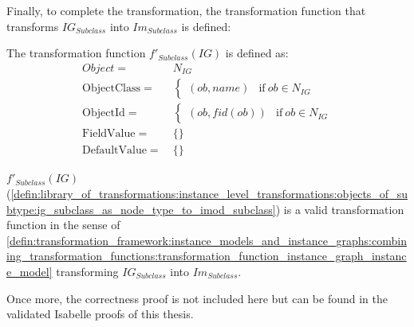 Finally, to complete the transformation, the transformation function that transforms $IG_{Subclass}$ into $Im_{Subclass}$ is defined:

\begin{defin}
\label{defin:library_of_transformations:instance_level_transformations:objects_of_subtype:ig_subclass_as_node_type_to_imod_subclass}
The transformation function $f'_{Subclass}(IG)$ is defined as:
\begin{align*}
Object =\ &N_{IG} \\
\mathrm{ObjectClass} =\ & \begin{cases}
    (ob, name) & \mathrm{if }\ ob \in N_{IG}
\end{cases}\\
\mathrm{ObjectId} =\ & \begin{cases}
    (ob, fid(ob)) & \mathrm{if }\ ob \in N_{IG}
\end{cases}\\
\mathrm{FieldValue} =\ & \{\} \\
\mathrm{DefaultValue} =\ & \{\}
\end{align*}
\end{defin}

\begin{thm}
\label{defin:library_of_transformations:instance_level_transformations:objects_of_subtype:ig_subclass_as_node_type_to_imod_subclass_func}
$f'_{Subclass}(IG)$ (\cref{defin:library_of_transformations:instance_level_transformations:objects_of_subtype:ig_subclass_as_node_type_to_imod_subclass}) is a valid transformation function in the sense of \cref{defin:transformation_framework:instance_models_and_instance_graphs:combining_transformation_functions:transformation_function_instance_graph_instance_model} transforming $IG_{Subclass}$ into $Im_{Subclass}$.
\end{thm}

Once more, the correctness proof is not included here but can be found in the validated Isabelle proofs of this thesis.